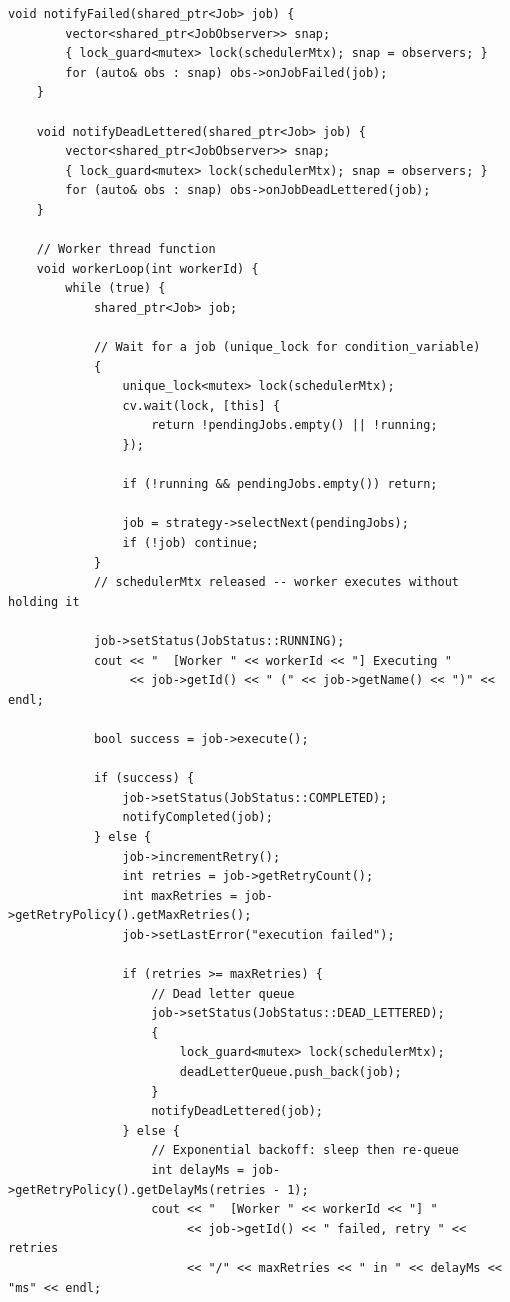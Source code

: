 \documentclass[11pt,a4paper]{article}
\begin{document}
\begin{lstlisting}[title={\texttt{managers.hpp}}]
    void notifyFailed(shared_ptr<Job> job) {
        vector<shared_ptr<JobObserver>> snap;
        { lock_guard<mutex> lock(schedulerMtx); snap = observers; }
        for (auto& obs : snap) obs->onJobFailed(job);
    }

    void notifyDeadLettered(shared_ptr<Job> job) {
        vector<shared_ptr<JobObserver>> snap;
        { lock_guard<mutex> lock(schedulerMtx); snap = observers; }
        for (auto& obs : snap) obs->onJobDeadLettered(job);
    }

    // Worker thread function
    void workerLoop(int workerId) {
        while (true) {
            shared_ptr<Job> job;

            // Wait for a job (unique_lock for condition_variable)
            {
                unique_lock<mutex> lock(schedulerMtx);
                cv.wait(lock, [this] {
                    return !pendingJobs.empty() || !running;
                });

                if (!running && pendingJobs.empty()) return;

                job = strategy->selectNext(pendingJobs);
                if (!job) continue;
            }
            // schedulerMtx released -- worker executes without holding it

            job->setStatus(JobStatus::RUNNING);
            cout << "  [Worker " << workerId << "] Executing "
                 << job->getId() << " (" << job->getName() << ")" << endl;

            bool success = job->execute();

            if (success) {
                job->setStatus(JobStatus::COMPLETED);
                notifyCompleted(job);
            } else {
                job->incrementRetry();
                int retries = job->getRetryCount();
                int maxRetries = job->getRetryPolicy().getMaxRetries();
                job->setLastError("execution failed");

                if (retries >= maxRetries) {
                    // Dead letter queue
                    job->setStatus(JobStatus::DEAD_LETTERED);
                    {
                        lock_guard<mutex> lock(schedulerMtx);
                        deadLetterQueue.push_back(job);
                    }
                    notifyDeadLettered(job);
                } else {
                    // Exponential backoff: sleep then re-queue
                    int delayMs = job->getRetryPolicy().getDelayMs(retries - 1);
                    cout << "  [Worker " << workerId << "] "
                         << job->getId() << " failed, retry " << retries
                         << "/" << maxRetries << " in " << delayMs << "ms" << endl;


\end{lstlisting}
\end{document}
